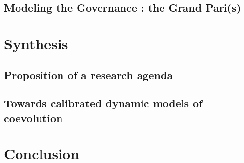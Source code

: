 \subsection{Modeling the Governance : the Grand Pari(s)}




\section{Synthesis}


\subsection{Proposition of a research agenda}





\subsection{Towards calibrated dynamic models of coevolution}








\section{Conclusion}
















